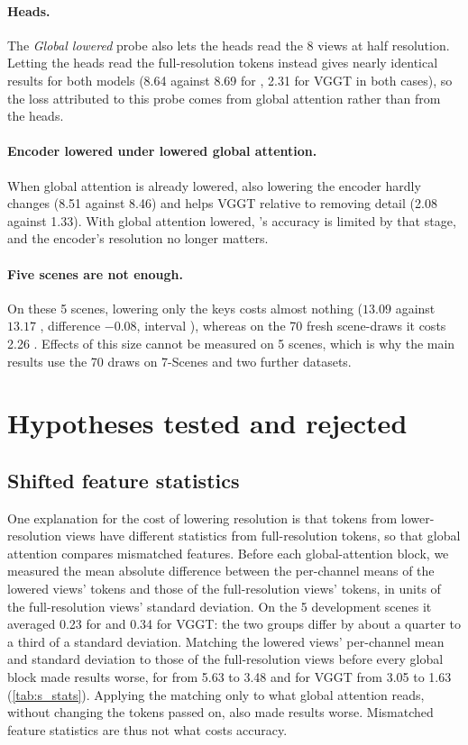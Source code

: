 \documentclass[10pt,twocolumn,letterpaper]{article}
\begin{document}
\paragraph{Heads.}
The \emph{Global lowered} probe also lets the heads read the 8 views at half resolution. Letting the heads read the full-resolution tokens instead gives nearly identical results for both models (8.64 against 8.69 \auc for \pithree, 2.31 for VGGT in both cases), so the loss attributed to this probe comes from global attention rather than from the heads.

\paragraph{Encoder lowered under lowered global attention.}
When global attention is already lowered, also lowering the encoder hardly changes \pithree (8.51 against 8.46) and helps VGGT relative to removing detail (2.08 against 1.33). With global attention lowered, \pithree's accuracy is limited by that stage, and the encoder's resolution no longer matters.

\paragraph{Five scenes are not enough.}
On these 5 scenes, lowering only the keys costs \pithree almost nothing ($13.09$ against $13.17$ \auc, difference $-0.08$, interval ), whereas on the 70 fresh scene-draws it costs 2.26 . Effects of this size cannot be measured on 5 scenes, which is why the main results use the 70 draws on 7-Scenes and two further datasets.

\section{Hypotheses tested and rejected}
\label{sec:s_rejected}

\subsection{Shifted feature statistics}
One explanation for the cost of lowering resolution is that tokens from lower-resolution views have different statistics from full-resolution tokens, so that global attention compares mismatched features. Before each global-attention block, we measured the mean absolute difference between the per-channel means of the lowered views' tokens and those of the full-resolution views' tokens, in units of the full-resolution views' standard deviation. On the 5 development scenes it averaged 0.23 for \pithree and 0.34 for VGGT: the two groups differ by about a quarter to a third of a standard deviation. Matching the lowered views' per-channel mean and standard deviation to those of the full-resolution views before every global block made results worse, for \pithree from 5.63 to 3.48 \auc and for VGGT from 3.05 to 1.63 (\cref{tab:s_stats}). Applying the matching only to what global attention reads, without changing the tokens passed on, also made results worse. Mismatched feature statistics are thus not what costs accuracy.
\end{document}
